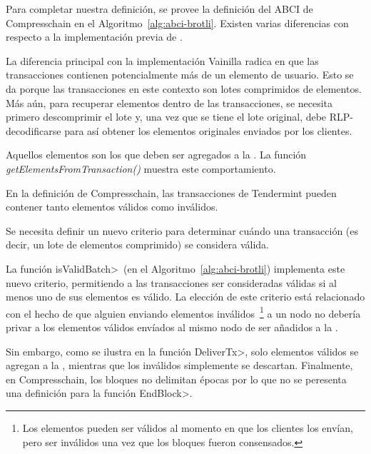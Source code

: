 
%
Para completar nuestra definición, se provee la definición del ABCI de Compresschain en el
Algoritmo~\ref{alg:abci-brotli}.
%
Existen varias diferencias con respecto a la implementación previa de \setchain.
%


La diferencia principal con la implementación Vainilla radica en que las transacciones contienen
potencialmente más de un elemento de usuario. Esto se da porque las transacciones en este contexto
son lotes comprimidos de elementos.
%
Más aún, para recuperar elementos dentro de las transacciones, se necesita primero descomprimir
el lote y, una vez que se tiene el lote original, debe RLP-decodificarse para así obtener los elementos
originales enviados por los clientes.

Aquellos elementos son los que deben ser agregados a la \setchain. La función \textit{getElementsFromTransaction()}
muestra este comportamiento.

En la definición de Compresschain, las transacciones de Tendermint pueden contener tanto elementos válidos
como inválidos.
%

Se necesita definir un nuevo criterio para determinar cuándo una transacción (es decir, un lote de elementos
comprimido) se considera válida.

%
La función \<isValidBatch>~(en el Algoritmo~\ref{alg:abci-brotli}) implementa este nuevo criterio, permitiendo
a las transacciones ser consideradas válidas si al menos uno de sus elementos es válido.
%
La elección de este criterio está relacionado con el hecho de que alguien enviando elementos inválidos~\footnote{
Los elementos pueden ser válidos al momento en que los clientes los envían, pero ser inválidos una vez que
los bloques fueron consensados.} a un nodo no debería privar a los elementos válidos envíados al mismo nodo de
ser añadidos a la \setchain.

%
Sin embargo, como se ilustra en la función \<DeliverTx>, solo elementos válidos se agregan a la \setchain,
mientras que los inválidos simplemente se descartan.
%
Finalmente, en Compresschain, los bloques no delimitan épocas por lo que no se peresenta una definición para
la función \<EndBlock>.

